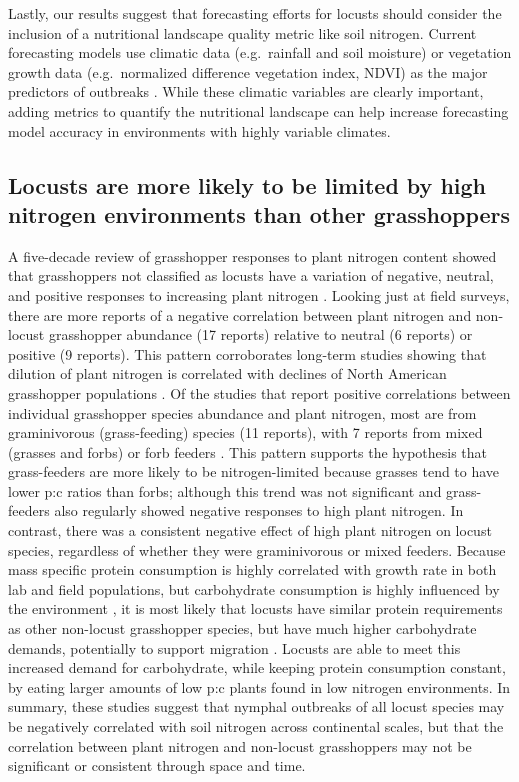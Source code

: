 \documentclass[
]{article}
\begin{document}
Lastly, our results suggest that forecasting efforts for locusts should
consider the inclusion of a nutritional landscape quality metric like
soil nitrogen. Current forecasting models use climatic data
(e.g.~rainfall and soil moisture) or vegetation growth data
(e.g.~normalized difference vegetation index, NDVI) as the major
predictors of outbreaks \citep{cressman_role_2013}. While these climatic
variables are clearly important, adding metrics to quantify the
nutritional landscape can help increase forecasting model accuracy in
environments with highly variable climates.

\subsection{Locusts are more likely to be limited by high nitrogen
environments than other
grasshoppers}\label{locusts-are-more-likely-to-be-limited-by-high-nitrogen-environments-than-other-grasshoppers}

A five-decade review of grasshopper responses to plant nitrogen content
showed that grasshoppers not classified as locusts have a variation of
negative, neutral, and positive responses to increasing plant nitrogen
\citep{cease_how_2024}. Looking just at field surveys, there are more
reports of a negative correlation between plant nitrogen and non-locust
grasshopper abundance (17 reports) relative to neutral (6 reports) or
positive (9 reports). This pattern corroborates long-term studies
showing that dilution of plant nitrogen is correlated with declines of
North American grasshopper populations \citep{welti_nutrient_2020}. Of
the studies that report positive correlations between individual
grasshopper species abundance and plant nitrogen, most are from
graminivorous (grass-feeding) species (11 reports), with 7 reports from
mixed (grasses and forbs) or forb feeders \citep{cease_how_2024}. This
pattern supports the hypothesis that grass-feeders are more likely to be
nitrogen-limited because grasses tend to have lower p:c ratios than
forbs; although this trend was not significant and grass-feeders also
regularly showed negative responses to high plant nitrogen. In contrast,
there was a consistent negative effect of high plant nitrogen on locust
species, regardless of whether they were graminivorous or mixed feeders.
Because mass specific protein consumption is highly correlated with
growth rate in both lab and field populations, but carbohydrate
consumption is highly influenced by the environment
\citep{talal_body_2024}, it is most likely that locusts have similar
protein requirements as other non-locust grasshopper species, but have
much higher carbohydrate demands, potentially to support migration
\citep{raubenheimer_integrative_1997, talal_high_2021, talal_body_2024}.
Locusts are able to meet this increased demand for carbohydrate, while
keeping protein consumption constant, by eating larger amounts of low
p:c plants found in low nitrogen environments. In summary, these studies
suggest that nymphal outbreaks of all locust species may be negatively
correlated with soil nitrogen across continental scales, but that the
correlation between plant nitrogen and non-locust grasshoppers may not
be significant or consistent through space and time.
\end{document}
